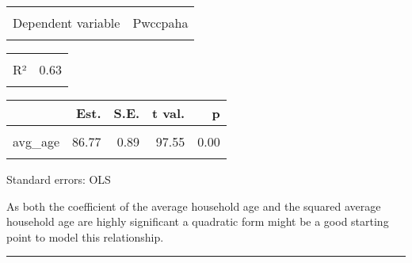 \documentclass[
]{article}
\begin{document}
\begin{table}[!h]
\centering
\begin{tabular}{lr}
\toprule
\cellcolor{gray!6}{Observations} & \cellcolor{gray!6}{12520}\\
Dependent variable & Pwccpaha\\
\cellcolor{gray!6}{Type} & \cellcolor{gray!6}{OLS linear regression}\\
\bottomrule
\end{tabular}
\end{table} \begin{table}[!h]
\centering
\begin{tabular}{lr}
\toprule
\cellcolor{gray!6}{F(2,12517)} & \cellcolor{gray!6}{10811.08}\\
R² & 0.63\\
\cellcolor{gray!6}{Adj. R²} & \cellcolor{gray!6}{0.63}\\
\bottomrule
\end{tabular}
\end{table} \begin{table}[!h]
\centering
\begin{threeparttable}
\begin{tabular}{lrrrr}
\toprule
  & Est. & S.E. & t val. & p\\
\midrule
\cellcolor{gray!6}{(Intercept)} & \cellcolor{gray!6}{-74.92} & \cellcolor{gray!6}{18.00} & \cellcolor{gray!6}{-4.16} & \cellcolor{gray!6}{0.00}\\
avg\_age & 86.77 & 0.89 & 97.55 & 0.00\\
\cellcolor{gray!6}{avg\_age\_2} & \cellcolor{gray!6}{-0.70} & \cellcolor{gray!6}{0.01} & \cellcolor{gray!6}{-74.86} & \cellcolor{gray!6}{0.00}\\
\bottomrule
\end{tabular}
\begin{tablenotes}
\item Standard errors: OLS
\end{tablenotes}
\end{threeparttable}
\end{table}

As both the coefficient of the average household age and the squared
average household age are highly significant a quadratic form might be a
good starting point to model this relationship.

\begin{center}\rule{0.5\linewidth}{0.5pt}\end{center}
\end{document}
